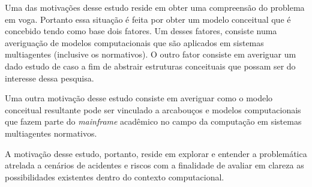 Uma das motivações desse estudo reside em obter uma compreensão do problema em voga. Portanto essa situação é feita por obter um modelo conceitual que é concebido tendo como base dois fatores. Um desses fatores, consiste numa averiguação de modelos computacionais que são aplicados em sistemas multiagentes (inclusive os normativos). O outro fator consiste em averiguar um dado estudo de caso a fim de abstrair estruturas conceituais que possam ser do interesse dessa pesquisa.

Uma outra motivação desse estudo consiste em averiguar como o modelo conceitual resultante pode ser vinculado a arcabouços e modelos computacionais que fazem parte do \textit{mainframe} acadêmico no campo da computação em sistemas multiagentes normativos.

A motivação desse estudo, portanto, reside em explorar e entender a problemática atrelada a cenários de acidentes e riscos com a finalidade de avaliar em clareza as possibilidades existentes dentro do contexto computacional.